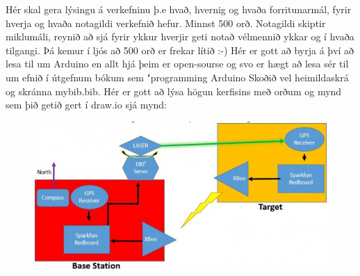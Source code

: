 Hér skal gera lýsingu á verkefninu þ.e hvað,  hvernig og  hvaða forritunarmál, fyrir hverja og hvaða notagildi verkefnið hefur. Minnst 500 orð. Notagildi skiptir miklumáli, reynið að sjá fyrir ykkur hverjir geti notað vélmennið ykkar og í hvaða tilgangi.  Þá kemur í ljós að 500 orð er frekar lítið :-) Hér er gott að byrja á því að lesa til um Arduino en allt hjá þeim er open-sourse og svo er hægt að lesa sér til um efnið í útgefnum bókum sem "programming Arduino \cite{monk} Skoðið vel heimildaskrá og skránna mybib.bib. Hér er gott að lýsa högun kerfisins með orðum og mynd sem þið getið gert í draw.io sjá mynd: 
\begin{figure}[h]
\includegraphics[scale=.3]{img/system}
\end{figure}
